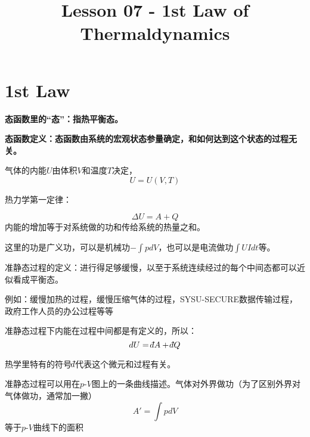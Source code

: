 \documentclass[CJK]{beamer}
\title{Lesson 07 - 1st Law of Thermaldynamics}
\author{}
\date{}
\begin{document}

\section{1st Law}

\begin{frame}
\bch
\bitem
\item{\bf 态函数里的“态”：指热平衡态。}
\item{\bf 态函数定义：态函数由系统的宏观状态参量确定，和如何达到这个状态的过程无关。}
\eitem

\bex
气体的内能$U$由体积$V$和温度$T$决定，
$$ U  = U(V, T)$$
\eex

\ech
\end{frame}


\begin{frame}
\bch
热力学第一定律：

{\blue
$$ \Delta U = A + Q$$
内能的增加等于对系统做的功和传给系统的热量之和。
}

\skiplines

这里的功是{\blue 广义功}，可以是机械功$-\int pdV$，也可以是电流做功$\int UIdt$等。




\ech
\end{frame}


\begin{frame}
\bch
准静态过程的定义：{\blue 进行得足够缓慢，以至于系统连续经过的每个中间态都可以近似看成平衡态。}

\skiplines

{\small 例如：缓慢加热的过程，缓慢压缩气体的过程，SYSU-SECURE数据传输过程，政府工作人员的办公过程等等}


\ech
\end{frame}


\begin{frame}
\bch
准静态过程下内能在过程中间都是有定义的，所以：
{\blue
$$dU = \dbar A + \dbar Q$$
}

热学里特有的符号$\dbar$代表这个微元和过程有关。

\ech
\end{frame}


\begin{frame}
\bch
准静态过程可以用在$p$-$V$图上的一条曲线描述。气体对外界做功（为了区别外界对气体做功，通常加一撇）
$$ A' = \int p dV $$
等于$p$-$V$曲线下的面积

\ech
\end{frame}
\end{document}
